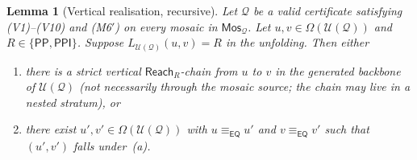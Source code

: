 \documentclass[11pt]{article}
\newtheorem{lemma}[theorem]{Lemma}
\theoremstyle{definition}
\theoremstyle{remark}
\newcommand{\PP}{\mathsf{PP}}
\newcommand{\PPI}{\mathsf{PPI}}
\newcommand{\EQ}{\mathsf{EQ}}
\newcommand{\Mos}{\mathsf{Mos}}
\newcommand{\Reach}{\mathsf{Reach}}
\newcommand{\Q}{\mathcal{Q}}
\newcommand{\U}{\mathcal{U}}
\newcommand{\eqc}{\equiv_{\EQ}}
\begin{document}
\begin{lemma}[Vertical realisation, recursive]\label{lem:vertreal-recursive}
Let $\Q$ be a valid certificate satisfying (V1)--(V10) and (M6$'$) on
every mosaic in $\Mos_\Q$.  Let $u,v\in\Omega(\U(\Q))$ and
$R\in\{\PP,\PPI\}$.  Suppose $L_{\U(\Q)}(u,v)=R$ in the unfolding.
Then either
\begin{enumerate}[label=(\alph*)]
\item there is a strict vertical $\Reach_R$-chain from $u$ to $v$ in
  the generated backbone of $\U(\Q)$ (\emph{not necessarily through
  the mosaic source}; the chain may live in a nested stratum), or
\item there exist $u',v'\in\Omega(\U(\Q))$ with $u\eqc u'$ and
  $v\eqc v'$ such that $(u',v')$ falls under~(a).
\end{enumerate}
\end{lemma}
\end{document}
